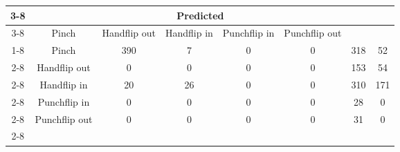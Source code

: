\documentclass{standalone}
\begin{document}
 
 \begin{tabular}{|c |c |c |c |c |c |c |c |}
\cline{3-8}\multicolumn{2}{c|}{} & \multicolumn{6}{c|}{Predicted} \\ 
\cline{3-8} \multicolumn{2}{c |}{ } & Pinch & Handflip out & Handflip in & Punchflip in & Punchflip out\\ 
\cline{1-8}\multirow{6}{*}{\rotatebox[origin=c]{90}{Actual}} & Pinch & 390 & 7 & 0 & 0 & 318 & 52\\ 
 \cline{2-8} & Handflip out & 0 & 0 & 0 & 0 & 153 & 54\\ 
 \cline{2-8} & Handflip in & 20 & 26 & 0 & 0 & 310 & 171\\ 
 \cline{2-8} & Punchflip in & 0 & 0 & 0 & 0 & 28 & 0\\ 
 \cline{2-8} & Punchflip out & 0 & 0 & 0 & 0 & 31 & 0\\ 
 \cline{2-8}\hline \end{tabular}
 
\end{document}
